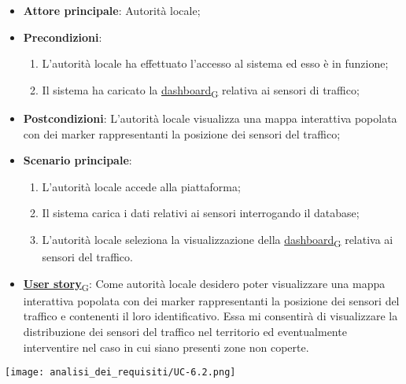 \begin{itemize}
	\item \textbf{Attore principale}: Autorità locale;
	\item \textbf{Precondizioni}:
	      \begin{enumerate}
		      \item L'autorità locale ha effettuato l'accesso al sistema ed esso è in funzione;
		      \item Il sistema ha caricato la \href{https://7last.github.io/docs/rtb/documentazione-interna/glossario\#dashboard}{dashboard\textsubscript{G}} relativa ai sensori di traffico;
	      \end{enumerate}
	\item \textbf{Postcondizioni}: L'autorità locale visualizza una mappa interattiva popolata con dei marker rappresentanti la posizione dei sensori del traffico;
	\item \textbf{Scenario principale}:
	      \begin{enumerate}
		      \item L'autorità locale accede alla piattaforma;
		      \item Il sistema carica i dati relativi ai sensori interrogando il database;
		      \item L'autorità locale seleziona la visualizzazione della \href{https://7last.github.io/docs/rtb/documentazione-interna/glossario\#dashboard}{dashboard\textsubscript{G}} relativa ai sensori del traffico.
	      \end{enumerate}
	\item \href{https://7last.github.io/docs/rtb/documentazione-interna/glossario\#user-story}{\textbf{User story}\textsubscript{G}}:
	      Come autorità locale desidero poter visualizzare una mappa interattiva popolata con dei marker rappresentanti la posizione dei sensori del traffico
	      e contenenti il loro identificativo. Essa mi consentirà di visualizzare la distribuzione dei sensori del traffico nel territorio ed eventualmente interventire nel caso in cui siano presenti zone non coperte.
\end{itemize}
\begin{center}
	\texttt{[image: analisi\_dei\_requisiti/UC-6.2.png]}
\end{center}

